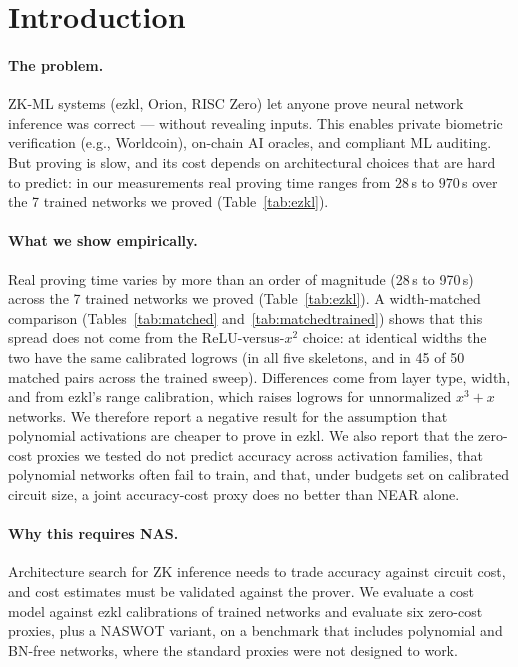\documentclass[10pt]{article}
\newcommand{\logrows}{\mathrm{logrows}}
\begin{document}
\section{Introduction}
\label{sec:intro}

\paragraph{The problem.}
ZK-ML systems (ezkl, Orion, RISC Zero) let anyone prove neural network
inference was correct --- without revealing inputs.  This enables private
biometric verification (e.g., Worldcoin), on-chain AI oracles, and
compliant ML auditing.  But proving is slow, and its cost depends on architectural choices that are hard to predict: in our measurements real
proving time ranges from $28$\,s to $970$\,s over the 7 trained networks we proved (Table~\ref{tab:ezkl}).

\paragraph{What we show empirically.}
Real proving time varies by more than an order of magnitude (28\,s to 970\,s) across the 7 trained networks we proved (Table~\ref{tab:ezkl}).  A width-matched comparison
(Tables~\ref{tab:matched} and~\ref{tab:matchedtrained}) shows that this spread does not come from the ReLU-versus-$x^2$ choice: at identical widths the two have the same calibrated $\logrows$
(in all five skeletons, and in 45 of 50 matched pairs across the trained sweep).  Differences come from layer type, width, and from ezkl's range calibration, which raises $\logrows$ for unnormalized
$x^3{+}x$ networks.  We therefore report a negative result for the assumption that polynomial activations are cheaper to prove in ezkl.  We also report that the zero-cost proxies we tested do not
predict accuracy across activation families, that polynomial networks often fail to train, and that, under budgets set on calibrated circuit size, a joint accuracy-cost proxy does no better than NEAR alone.

\paragraph{Why this requires NAS.}
Architecture search for ZK inference needs to trade accuracy against circuit cost, and cost estimates must be validated against the prover.  We evaluate a cost model against ezkl calibrations of trained networks
and evaluate six zero-cost proxies, plus a NASWOT variant, on a benchmark that includes polynomial and BN-free networks, where the standard proxies were not designed to work.
\end{document}
